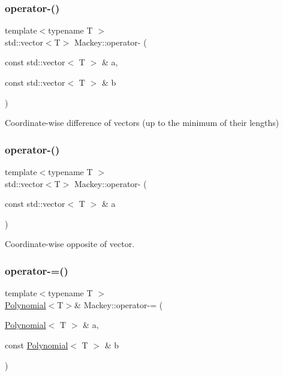 \mbox{\label{namespaceMackey_ae86e49097ef9a09ebcd0173881e88786}} 
\subsubsection{\texorpdfstring{operator-\/()}{operator-()}\hspace{0.1cm}{\footnotesize\ttfamily [3/4]}}
{\footnotesize\ttfamily template$<$typename T $>$ \\
std\+::vector$<$T$>$ Mackey\+::operator-\/ (\begin{DoxyParamCaption}\item[{const std\+::vector$<$ T $>$ \&}]{a,  }\item[{const std\+::vector$<$ T $>$ \&}]{b }\end{DoxyParamCaption})}



Coordinate-\/wise difference of vectors (up to the minimum of their lengths) 

\mbox{\label{namespaceMackey_a9d67cfe3e93ac3ef2301547372b48e15}} 
\subsubsection{\texorpdfstring{operator-\/()}{operator-()}\hspace{0.1cm}{\footnotesize\ttfamily [4/4]}}
{\footnotesize\ttfamily template$<$typename T $>$ \\
std\+::vector$<$T$>$ Mackey\+::operator-\/ (\begin{DoxyParamCaption}\item[{const std\+::vector$<$ T $>$ \&}]{a }\end{DoxyParamCaption})}



Coordinate-\/wise opposite of vector. 

\mbox{\label{namespaceMackey_a9cb1fbb70826d41d001bef40d09d9e3f}} 
\subsubsection{\texorpdfstring{operator-\/=()}{operator-=()}}
{\footnotesize\ttfamily template$<$typename T $>$ \\
\hyperlink{classMackey_1_1Polynomial}{Polynomial}$<$T$>$\& Mackey\+::operator-\/= (\begin{DoxyParamCaption}\item[{\hyperlink{classMackey_1_1Polynomial}{Polynomial}$<$ T $>$ \&}]{a,  }\item[{const \hyperlink{classMackey_1_1Polynomial}{Polynomial}$<$ T $>$ \&}]{b }\end{DoxyParamCaption})}

